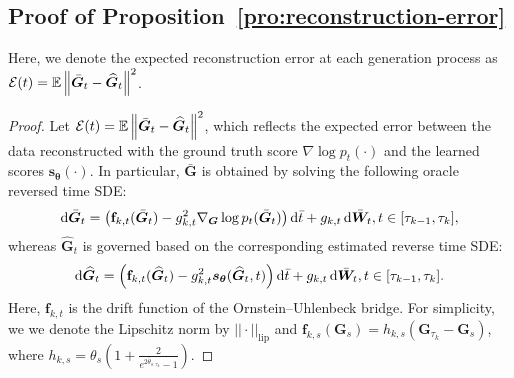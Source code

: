 \subsection{Proof of Proposition~\ref{pro:reconstruction-error}}

Here, we denote the expected reconstruction error at each generation process
 as $\mathcal{E}(t)=\mathbb{E}\left\|\bar{\bm{G}}_t-\widehat{\bm{G}}_t\right\|^2$.

\begin{customthe}

\end{customthe}
 

\begin{proof}

Let $\mathcal{E}(t)= \mathbb{E}\left\|\bar{\bm{G}}_t-\widehat{\bm{G}}_t\right\|^2$, which reflects the expected error between the data reconstructed with the ground truth score $\nabla \log p_t(\cdot)$ and the learned scores $\bm{s}_{\bm{\theta}} (\cdot)$.  
%
In particular, $\bar{\bm{G}}$ is obtained by solving the following oracle reversed time SDE:
\begin{equation}
    \mathop{}\!\mathrm{d} \bar{\bm{G}}_t=\left(\mathbf{f}_{k,t}(\bar{\bm{G}}_t)-g_{k,t}^2 \nabla_{\bm{G}}\log p_t(\bar{\bm{G}}_t)\right)\mathop{}\!\mathrm{d}\bar{t}
    +g_{k,t}\mathop{}\!\mathrm{d} \bar{\bm{W}}_t, t\in[\tau_{k-1},\tau_k],
\end{equation}
whereas $\widehat{\bm{G}}_t$ is governed based on the corresponding estimated reverse time SDE:
\begin{equation}
    \mathrm{d}\widehat{\bm{G}}_t=\left(\mathbf{f}_{k,t}(\widehat{\bm{G}}_t)-g_{k,t}^2 \bm{s}_{\bm{\theta}}(\widehat{\bm{G}}_t,t)\right)\mathop{}\!\mathrm{d}\bar{t}
    +g_{k,t}\mathop{}\!\mathrm{d}\bar{\bm{W}}_t, t\in [\tau_{k-1},\tau_k].
\end{equation}
Here, $\mathbf{f}_{k,t}$ is the drift function of the Ornstein–Uhlenbeck bridge. 
For simplicity, we we denote the Lipschitz norm by $||\cdot||_{\operatorname{lip}}$ and $\mathbf{f}_{k,s}(\bm{G}_s)=h_{k,s}(\bm{G}_{\tau_k}-\bm{G}_s)$, where $h_{k,s}=\theta_s \left(1 + \frac{2}{e^{2\bar{\theta}_{s:\tau_k}}-1}\right)$. 



\end{proof}

